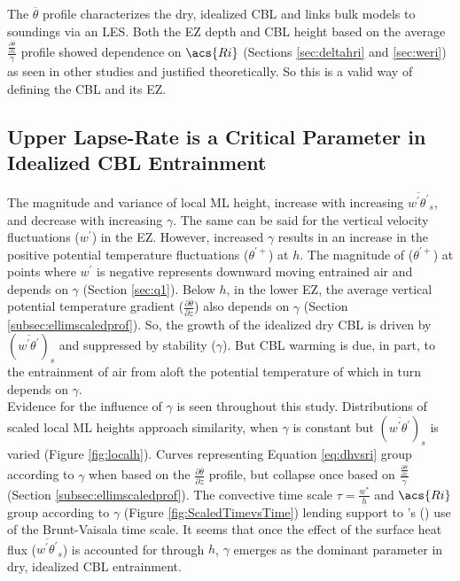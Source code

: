 The $\overline{\theta}$ profile characterizes the dry, idealized \acs{CBL} and links bulk models to soundings via an \acs{LES}.  Both the \acs{EZ} depth and \acs{CBL} height based on the average $\frac{\frac{\partial \overline{\theta}}{\partial z}}{\gamma}$ profile showed dependence on $\acs{Ri}$ (Sections \ref{sec:deltahri} and \ref{sec:weri}) as seen in other studies and justified theoretically.  So this is a valid way of defining the \acs{CBL} and its \acs{EZ}.  

\subsection{Upper Lapse-Rate is a Critical Parameter in Idealized \acs{CBL} Entrainment}

The magnitude and variance of local \acs{ML} height, increase with increasing $\overline{w^{'}\theta^{'}}_{s}$, and decrease with increasing $\gamma$.  The same can be said for the vertical velocity fluctuations ($w^{'}$) in the \acs{EZ}.  However, increased $\gamma$ results in an increase in the positive potential temperature fluctuations ($\theta^{'+}$) at $h$. The magnitude of ($\theta^{'+}$) at points where $w^{'}$ is negative represents downward moving entrained air and depends on $\gamma$ (Section \ref{sec:q1}).  Below $h$, in the lower \acs{EZ}, the average vertical potential temperature gradient ($\frac{\partial \overline{\theta}}{\partial z}$) also depends on $\gamma$ (Section \ref{subsec:ellimscaledprof}). So, the growth of the idealized dry \acs{CBL} is driven by $(\overline{w^{'}\theta^{'}})_{s}$ and suppressed by stability ($\gamma$). But \acs{CBL} warming is due, in part, to the entrainment of air from aloft the potential temperature of which in turn depends on $\gamma$.\\

Evidence for the influence of $\gamma$ is seen throughout this study.  Distributions of scaled local \acs{ML} heights approach similarity, when $\gamma$ is constant but $(\overline{w^{'}\theta^{'}})_{s}$ is varied (Figure \ref{fig:localh}).  Curves representing Equation \ref{eq:dhvsri} group according to $\gamma$ when based on the $\frac{\partial \overline{\theta}}{\partial z}$ profile, but collapse once based on $\frac{\frac{\partial \overline{\theta}}{\partial z}}{\gamma}$ (Section \ref{subsec:ellimscaledprof}).  The convective time scale $\tau = \frac{w^{*}}{h}$ and $\acs{Ri}$ group according to $\gamma$ (Figure \ref{fig:ScaledTimevsTime}) lending support to \citeauthor{FedConzMir04}'s (\citeyear{FedConzMir04}) use of the Brunt-Vaisala time scale.  It seems that once the effect of the surface heat flux ($\overline{w^{'}\theta^{'}}_{s}$) is accounted for through $h$, $\gamma$ emerges as the dominant parameter in dry, idealized \acs{CBL} entrainment.\\ 

